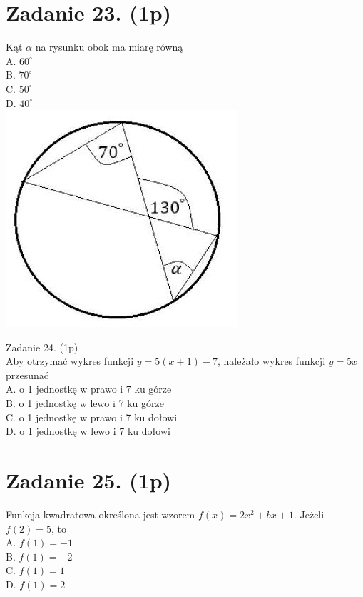 \documentclass[10pt]{article}
\begin{document}
\section*{Zadanie 23. (1p)}
Kąt \(\alpha\) na rysunku obok ma miarę równą\\
A. \(60^{\circ}\)\\
B. \(70^{\circ}\)\\
C. \(50^{\circ}\)\\
D. \(40^{\circ}\)\\
\includegraphics[max width=\textwidth, center]{2024_11_21_eef8bdc8380ba249dbe1g-06}

Zadanie 24. (1p)\\
Aby otrzymać wykres funkcji \(y=5(x+1)-7\), należało wykres funkcji \(y=5 x\) przesunać\\
A. o 1 jednostkę w prawo i 7 ku górze\\
B. o 1 jednostkę w lewo i 7 ku górze\\
C. o 1 jednostkę w prawo i 7 ku dołowi\\
D. o 1 jednostkę w lewo i 7 ku dołowi

\section*{Zadanie 25. (1p)}
Funkcja kwadratowa określona jest wzorem \(f(x)=2 x^{2}+b x+1\). Jeżeli \(f(2)=5\), to\\
A. \(f(1)=-1\)\\
B. \(f(1)=-2\)\\
C. \(f(1)=1\)\\
D. \(f(1)=2\)
\end{document}
